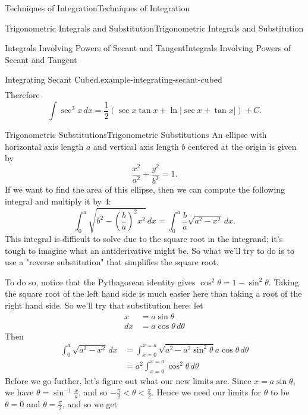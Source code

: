 \documentclass[10pt,]{book}
\numberwithin{equation}{section}
\newcommand{\lt}{<}
\begin{document}
\begin{chapterptx}{Techniques of Integration}{}{Techniques of Integration}{}{}
\begin{sectionptx}{Trigonometric Integrals and Substitution}{}{Trigonometric Integrals and Substitution}{}{}
\begin{subsectionptx}{Integrals Involving Powers of Secant and Tangent}{}{Integrals Involving Powers of Secant and Tangent}{}{}
\begin{example}{Integrating Secant Cubed.}{example-integrating-secant-cubed}
\begin{align*}
\end{align*}
\hypertarget{p-541}{}%
Therefore%
\begin{equation*}
\int\sec^{3}x\,dx = \frac{1}{2}(\sec x\tan x + \ln|\sec x + \tan x|) + C.
\end{equation*}
%
\end{example}
\end{subsectionptx}
%
%
\typeout{************************************************}
\typeout{************************************************}
%
\begin{subsectionptx}{Trigonometric Substitutions}{}{Trigonometric Substitutions}{}{}\label{subsection-trigonometric-substitutions}
\hypertarget{p-542}{}%
An ellipse with horizontal axis length \(a\) and vertical axis length \(b\) centered at the origin is given by%
\begin{equation*}
\frac{x^{2}}{a^{2}} + \frac{y^{2}}{b^{2}} = 1.
\end{equation*}
If we want to find the area of this ellipse, then we can compute the following integral and multiply it by \(4\):%
\begin{equation*}
\int_{0}^{a}\sqrt{b^{2} - (\frac{b}{a})^{2}x^{2}}\,dx = \int_{0}^{a}\frac{b}{a}\sqrt{a^{2} - x^{2}}\,dx.
\end{equation*}
This integral is difficult to solve due to the square root in the integrand; it's tough to imagine what an antiderivative might be. So what we'll try to do is to use a "reverse substitution" that simplifies the square root.%
\par
\hypertarget{p-543}{}%
To do so, notice that the Pythagorean identity gives \(\cos^{2}\theta = 1 - \sin^{2}\theta\). Taking the square root of the left hand side is much easier here than taking a root of the right hand side. So we'll try that substitution here: let%
\begin{align*}
x & = a\sin\theta \\
dx & = a\cos\theta\,d\theta 
\end{align*}
Then%
\begin{align*}
\int_{0}^{a}\sqrt{a^{2} - x^{2}}\,dx & = \int_{x = 0}^{x = a}\sqrt{a^{2} - a^{2}\sin^{2}\theta}a\cos\theta\,d\theta \\
& = a^{2}\int_{x = 0}^{x = a}\cos^{2}\theta\,d\theta 
\end{align*}
Before we go further, let's figure out what our new limits are. Since \(x = a\sin\theta\), we have \(\theta = \sin^{-1}\frac{x}{a}\), and so \(-\frac{\pi}{2} \lt \theta \lt \frac{\pi}{2}\). Hence we need our limits for \(\theta\) to be \(\theta = 0\) and \(\theta = \frac{\pi}{2}\), and so we get%

\end{subsectionptx}
\end{sectionptx}
\end{chapterptx}
\end{document}
